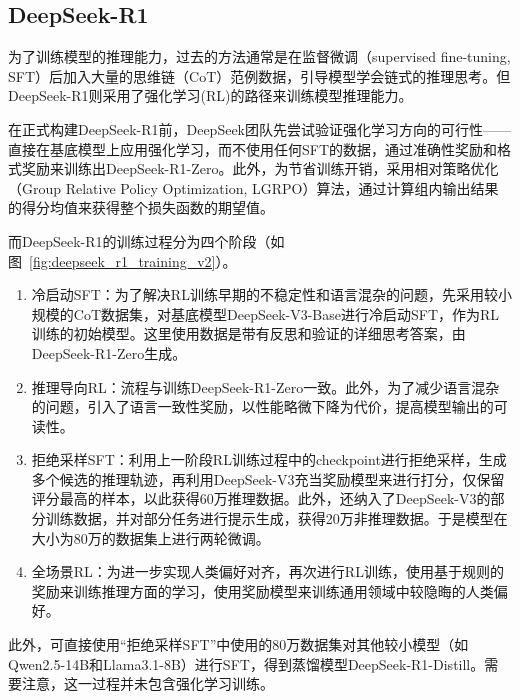 \subsection{DeepSeek-R1}

为了训练模型的推理能力，过去的方法通常是在监督微调（supervised fine-tuning, SFT）后加入大量的思维链（CoT）范例数据，引导模型学会链式的推理思考。但DeepSeek-R1\cite{deepseek-aiDeepSeekR1IncentivizingReasoning2025}则采用了强化学习(RL)的路径来训练模型推理能力。

在正式构建DeepSeek-R1前，DeepSeek团队先尝试验证强化学习方向的可行性——直接在基底模型上应用强化学习，而不使用任何SFT的数据，通过准确性奖励和格式奖励来训练出DeepSeek-R1-Zero。此外，为节省训练开销，采用相对策略优化（Group Relative Policy Optimization, LGRPO）算法，通过计算组内输出结果的得分均值来获得整个损失函数的期望值。

而DeepSeek-R1的训练过程分为四个阶段（如图~\ref{fig:deepseek_r1_training_v2}）。
\begin{enumerate}
    \item 冷启动SFT：为了解决RL训练早期的不稳定性和语言混杂的问题，先采用较小规模的CoT数据集，对基底模型DeepSeek-V3-Base进行冷启动SFT，作为RL训练的初始模型。这里使用数据是带有反思和验证的详细思考答案，由DeepSeek-R1-Zero生成。
    \item 推理导向RL：流程与训练DeepSeek-R1-Zero一致。此外，为了减少语言混杂的问题，引入了语言一致性奖励，以性能略微下降为代价，提高模型输出的可读性。
    \item 拒绝采样SFT：利用上一阶段RL训练过程中的checkpoint进行拒绝采样，生成多个候选的推理轨迹，再利用DeepSeek-V3充当奖励模型来进行打分，仅保留评分最高的样本，以此获得60万推理数据。此外，还纳入了DeepSeek-V3的部分训练数据，并对部分任务进行提示生成，获得20万非推理数据。于是模型在大小为80万的数据集上进行两轮微调。
    \item 全场景RL：为进一步实现人类偏好对齐，再次进行RL训练，使用基于规则的奖励来训练推理方面的学习，使用奖励模型来训练通用领域中较隐晦的人类偏好。
\end{enumerate}

此外，可直接使用“拒绝采样SFT”中使用的80万数据集对其他较小模型（如Qwen2.5-14B和Llama3.1-8B）进行SFT，得到蒸馏模型DeepSeek-R1-Distill。需要注意，这一过程并未包含强化学习训练。

